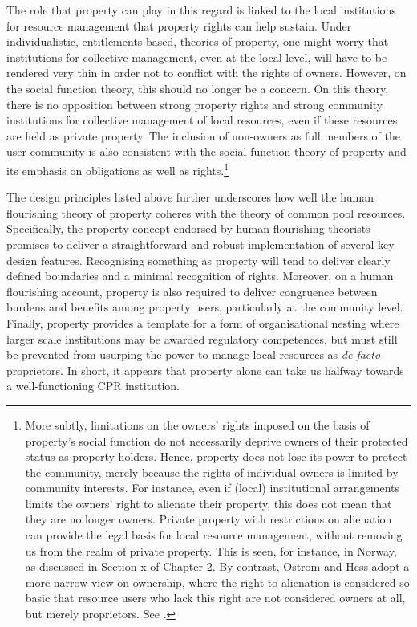 The role that property can play in this regard is linked to the local institutions for resource management that property rights can help sustain. Under individualistic, entitlements-based, theories of property, one might worry that institutions for collective management, even at the local level, will have to be rendered very thin in order not to conflict with the rights of owners. However, on the social function theory, this should no longer be a concern. On this theory, there is no opposition between strong property rights and strong community institutions for collective management of local resources, even if these resources are held as private property. The inclusion of non-owners as full members of the user community is also consistent with the social function theory of property and its emphasis on obligations as well as rights.\footnote{More subtly, limitations on the owners' rights imposed on the basis of property's social function do not necessarily deprive owners of their protected status as property holders. Hence, property does not lose its power to protect the community, merely because the rights of individual owners is limited by community interests. For instance, even if (local) institutional arrangements limits the owners' right to alienate their property, this does not mean that they are no longer owners. Private property with restrictions on alienation can provide the legal basis for local resource management, without removing us from the realm of private property. This is seen, for instance, in Norway, as discussed in Section x of Chapter 2. By contrast, Ostrom and Hess adopt a more narrow view on ownership, where the right to alienation is considered so basic that resource users who lack this right are not considered owners at all, but merely proprietors. See \cite[...]{ostrom07}.}

The design principles listed above further underscores how well the human flourishing theory of property coheres with the theory of common pool resources. Specifically, the property concept endorsed by human flourishing theorists promises to deliver a straightforward and robust implementation of several key design features. Recognising something as property will tend to deliver clearly defined boundaries and a minimal recognition of rights. Moreover, on a human flourishing account, property is also required to deliver congruence between burdens and benefits among property users, particularly at the community level. Finally, property provides a template for a form of organisational nesting where larger scale institutions may be awarded regulatory competences, but must still be prevented from usurping the power to manage local resources as {\it de facto} proprietors. In short, it appears that property alone can take us halfway towards a well-functioning CPR institution.

